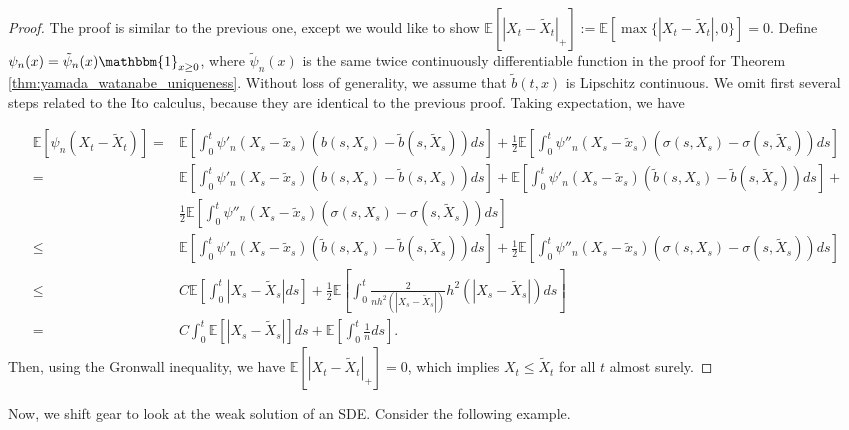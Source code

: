 \documentclass{article}
\begin{document}
\begin{proof}
The proof is similar to the previous one, except we would like to show $\mathbb{E}[|X_t-\tilde{X}_t|_+]:=\mathbb{E}[\max\{|X_t-\tilde{X}_t|,0\}]=0$. Define $\psi_n(x)=\tilde{\psi}_n(x)\mathbbm{1}_{x\geq0}$, where $\tilde{\psi}_n(x)$ is the same twice continuously differentiable function in the proof for Theorem \ref{thm:yamada_watanabe_uniqueness}. Without loss of generality, we assume that $\tilde{b}(t,x)$ is Lipschitz continuous. We omit first several steps related to the Ito calculus, because they are identical to the previous proof. Taking expectation, we have

\begin{equation*}
\begin{aligned}
\mathbb{E}[\psi_n(X_t-\tilde{X}_t)]=&\mathbb{E}[\int^t_0\psi'_n(X_s-\tilde{x}_s)(b(s,X_s)-\tilde{b}(s,\tilde{X}_s))ds]+\frac{1}{2}\mathbb{E}[\int^t_0\psi''_n(X_s-\tilde{x}_s)(\sigma(s,X_s)-\sigma(s,\tilde{X}_s))ds]\\
=&\mathbb{E}[\int^t_0\psi'_n(X_s-\tilde{x}_s)(b(s,X_s)-\tilde{b}(s,X_s))ds]+\mathbb{E}[\int^t_0\psi'_n(X_s-\tilde{x}_s)(\tilde{b}(s,X_s)-\tilde{b}(s,\tilde{X}_s))ds]+\\
&\frac{1}{2}\mathbb{E}[\int^t_0\psi''_n(X_s-\tilde{x}_s)(\sigma(s,X_s)-\sigma(s,\tilde{X}_s))ds]\\
\leq&\mathbb{E}[\int^t_0\psi'_n(X_s-\tilde{x}_s)(\tilde{b}(s,X_s)-\tilde{b}(s,\tilde{X}_s))ds]+\frac{1}{2}\mathbb{E}[\int^t_0\psi''_n(X_s-\tilde{x}_s)(\sigma(s,X_s)-\sigma(s,\tilde{X}_s))ds]\\
\leq&C\mathbb{E}[\int^t_0|X_s-\tilde{X}_s|ds]+\frac{1}{2}\mathbb{E}[\int^t_0\frac{2}{nh^2(|X_s-\tilde{X}_s|)}h^2(|X_s-\tilde{X}_s|)ds]\\
=&C\int^t_0\mathbb{E}[|X_s-\tilde{X}_s|]ds+\mathbb{E}[\int^t_0\frac{1}{n}ds].
\end{aligned}
\end{equation*}
Then, using the Gronwall inequality, we have $\mathbb{E}[|X_t-\tilde{X}_t|_+]=0$, which implies $X_t\leq\tilde{X}_t$ for all $t$ almost surely. 
\end{proof}

Now, we shift gear to look at the weak solution of an SDE. Consider the following example.
\end{document}
